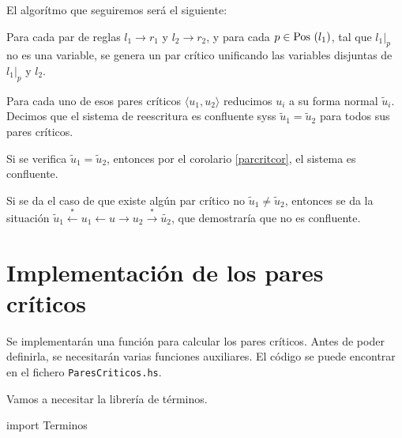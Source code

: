 \begin{demo}
  El algorítmo que seguiremos será el siguiente:

  Para cada par de reglas $l_1 \rightarrow r_1$ y
  $l_2 \rightarrow r_2$, y para cada $p \in \mbox{Pos }(l_1)$, tal que
  $l_1|_p$ no es una variable, se genera un par crítico unificando las
  variables disjuntas de $l_1|_p$ y $l_2$.

  Para cada uno de esos pares críticos $\langle u_1, u_2 \rangle$
  reducimos $u_i$ a su forma normal $\tilde{u}_i$. Decimos que el
  sistema de reescritura es confluente syss
  $\tilde{u}_1 = \tilde{u}_2$ para todos sus pares críticos.

  Si se verifica $\tilde{u}_1 = \tilde{u}_2$, entonces por el
  corolario \ref{parcritcor}, el sistema es confluente.

  Si se da el caso de que existe algún par crítico no
  $\tilde{u}_1 \not = \tilde{u}_2$, entonces se da la situación
  $\tilde{u}_1 \xleftarrow{*} u_1 \leftarrow u \rightarrow u_2
  \xrightarrow{*} \tilde{u_2}$, que demostraría que no es confluente.
\end{demo}

\section{Implementación de los pares críticos}

Se implementarán una función para calcular los pares críticos. Antes
de poder definirla, se necesitarán varias funciones auxiliares. El
código se puede encontrar en el fichero \texttt{ParesCriticos.hs}.

Vamos a necesitar la librería de términos.
\begin{codigo}
import Terminos
\end{codigo}

